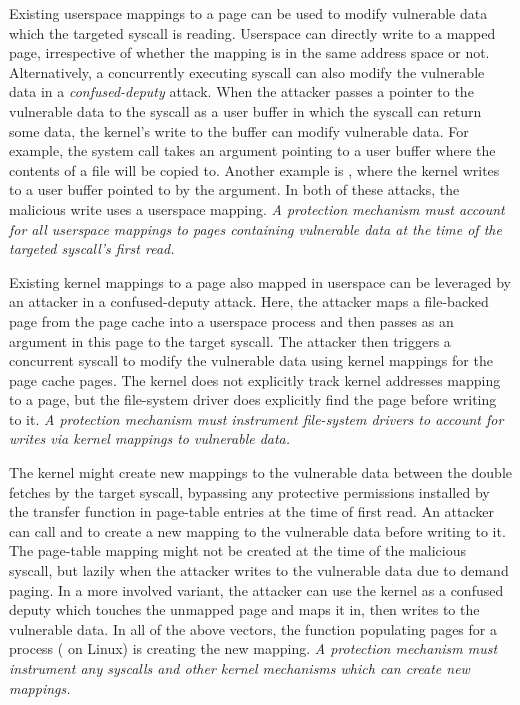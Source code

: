 \documentclass[letterpaper,twocolumn,10pt]{article}
\begin{document}
Existing userspace mappings to a page can be used to modify
vulnerable data which the targeted syscall is reading.
Userspace can directly write to a mapped page, irrespective of whether the mapping is
in the same address space or not.
Alternatively, a concurrently executing syscall can also modify the
vulnerable data in a \emph{confused-deputy} attack.
When the attacker passes a pointer to the vulnerable data to
the syscall as a user buffer in which the syscall can return some
data, the kernel's write to the buffer can modify vulnerable data.
For example, the  system call takes an argument pointing
to a user buffer where the contents of a file will be copied to.
Another example is , where the kernel writes to
a user buffer pointed to by the  argument.
In both of these attacks, the malicious write uses a userspace
mapping.
\emph{A protection mechanism must account for all userspace
mappings to pages containing vulnerable data at the time of the
targeted syscall's first read.}

Existing kernel mappings to a page also mapped in userspace can be
leveraged by an attacker in a confused-deputy attack.
Here, the attacker maps a file-backed page from the page cache into a
userspace process and then passes as an argument in this page to the
target syscall.
The attacker then triggers a concurrent  syscall to modify the
vulnerable data using kernel mappings for the page cache
pages.
The kernel does not explicitly track kernel addresses mapping to a page,
but the file-system driver does explicitly find the page before writing to it.
\emph{A protection mechanism must instrument file-system
drivers to account for writes via kernel mappings to vulnerable data.}

The kernel might create new mappings to the vulnerable data
between the double fetches by the target syscall, bypassing any 
protective permissions installed by the transfer function in 
page-table entries at the time of first read.
An attacker can call  and  to create
a new mapping to the vulnerable data before writing to it.
The page-table mapping might not be created at the time of the malicious
syscall, but lazily when the attacker writes to the vulnerable data
due to demand paging.
In a more involved variant, the attacker can use the kernel as a
confused deputy which touches the unmapped page and maps it in,
then writes to the vulnerable data.
In all of the above vectors, the function populating pages for a
process ( on Linux) is creating the new mapping.
\emph{A protection mechanism must instrument any syscalls
and other kernel mechanisms which can create new mappings.}
\end{document}
